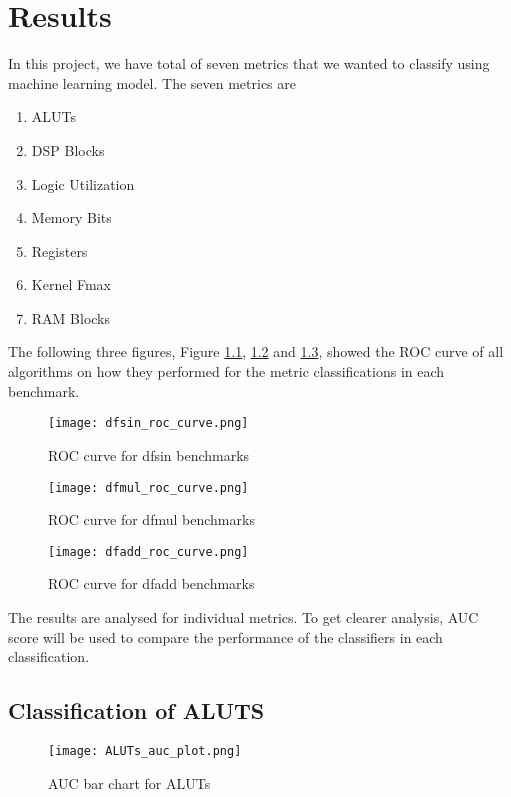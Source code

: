 \chapter{Results}

In this project, we have total of seven metrics that we wanted to classify using machine learning model. The seven metrics are

\begin{enumerate}
    \item ALUTs
    \item DSP Blocks
    \item Logic Utilization
    \item Memory Bits
    \item Registers
    \item Kernel Fmax
    \item RAM Blocks
\end{enumerate}

The following three figures, Figure \ref{figure:dfsin_roc_curve}, \ref{figure:dfmul_roc_curve} and \ref{figure:dfadd_roc_curve}, showed the ROC curve of all algorithms on how they performed for the metric classifications in each benchmark.

\begin{figure}[H]
\centering
\texttt{[image: dfsin\_roc\_curve.png]}
\caption{ROC curve for dfsin benchmarks}
\label{figure:dfsin_roc_curve}
\end{figure}

\begin{figure}[H]
\centering
\texttt{[image: dfmul\_roc\_curve.png]}
\caption{ROC curve for dfmul benchmarks}
\label{figure:dfmul_roc_curve}
\end{figure}

\begin{figure}[H]
\centering
\texttt{[image: dfadd\_roc\_curve.png]}
\caption{ROC curve for dfadd benchmarks}
\label{figure:dfadd_roc_curve}
\end{figure}

The results are analysed for individual metrics. To get clearer analysis, AUC score will be used to compare the performance of the classifiers in each classification.

\section{Classification of ALUTS}
\begin{figure}[h!]
\centering
\texttt{[image: ALUTs\_auc\_plot.png]}
\caption{AUC bar chart for ALUTs}
\label{figure:ALUTs_auc_plot}
\end{figure}

